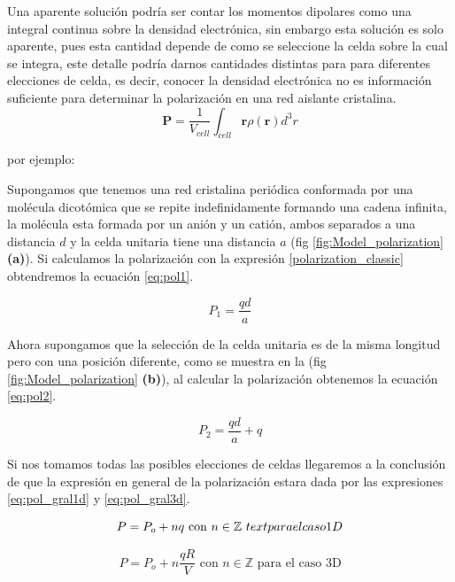 

Una aparente solución podría ser contar los momentos dipolares como una integral continua sobre la densidad electrónica, sin embargo esta solución es solo aparente, pues esta cantidad depende de como se seleccione la celda sobre la cual se integra, este detalle podría darnos cantidades distintas para para diferentes elecciones de celda, es decir, conocer la densidad electrónica no es información suficiente para determinar la polarización en una red aislante cristalina.
\begin{equation}
\label{polarization_classic}
\textbf{P} = \frac{1}{V_{cell}}\int_{cell} \textbf{r} \rho(\textbf{r})d^3r
\end{equation}

por ejemplo:

Supongamos que tenemos una red cristalina periódica conformada por una molécula dicotómica que se repite indefinidamente formando una cadena infinita, la molécula esta formada por un anión y un catión, ambos separados a una distancia $d$ y la celda unitaria tiene una distancia $a$ (fig \ref{fig:Model_polarization} \textbf{(a)}). Si calculamos la polarización con la expresión \ref{polarization_classic} obtendremos la ecuación \ref{eq:pol1}.

\begin{equation}
    \label{eq:pol1}
    P_1 = \frac{qd}{a}
\end{equation}

Ahora supongamos que la selección de la celda unitaria es de la misma longitud pero con una posición diferente, como se muestra en la (fig \ref{fig:Model_polarization} \textbf{(b)}), al calcular la polarización obtenemos la ecuación \ref{eq:pol2}.

\begin{equation}
    \label{eq:pol2}
    P_2 = \frac{qd}{a} + q
\end{equation}

Si nos tomamos todas las posibles elecciones de celdas llegaremos a la conclusión de que la expresión en general de la polarización estara dada por las expresiones \ref{eq:pol_gral1d} y \ref{eq:pol_gral3d}.

\begin{equation}
    \label{eq:pol_gral1d}
    P = P_o + nq\,\,  {\rm con} \,\,n \in \mathbb{Z}\,\, text{para el caso 1D} 
\end{equation}

\begin{equation}
    \label{eq:pol_gral3d}
    P = P_o + n\frac{qR}{V}\,\,  \text{con} \,\,n \in \mathbb{Z}\,\, \text{para el caso 3D}
\end{equation}

